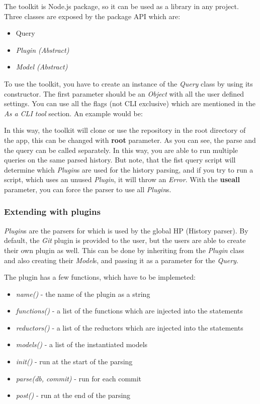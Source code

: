 The toolkit is Node.js package, so it can be used as a library in any project.
Three classes are exposed by the package API which are:

\begin{itemize}
	\item Query
	\item \textit{Plugin (Abstract)}
	\item \textit{Model (Abstract)}
\end{itemize}

To use the toolkit, you have to create an instance of the \textit{Query} class by using its constructor.
The first parameter should be an \textit{Object} with all the user defined settings. 
You can use all the flags (not CLI exclusive) which are mentioned in the \textit{As a CLI tool} section.
An example would be:



In this way, the toolkit will clone or use the repository in the root directory of the app, this can be changed with \textbf{root} parameter.
As you can see, the parse and the query can be called separately. In this way, you are able to run multiple queries on the same parsed history.
But note, that the fist query script will determine which \textit{Plugin}s are used for the history parsing, and if you try to run a script, which
uses an unused \textit{Plugin}, it will throw an \textit{Error}. With the \textbf{useall} parameter, you can force the parser to use all \textit{Plugin}s.

\subsubsection{Extending with plugins}

\textit{Plugin}s are the parsers for which is used by the global HP (History parser). 
By default, the \textit{Git} plugin is provided to the user, but the users are able to create their own plugin as well.
\newline
This can be done by inheriting from the \textit{Plugin} class and also creating their \textit{Model}s, and passing it as a parameter for the \textit{Query}.

The plugin has a few functions, which have to be implemeted:
\begin{itemize}
	\item \textit{name()} - the name of the plugin as a string
	\item \textit{functions()} - a list of the functions which are injected into the statements
	\item \textit{reductors()} - a list of the reductors which are injected into the statements
	\item \textit{models()} - a list of the instantiated models
 
	\item \textit{init()} - run at the start of the parsing
	\item \textit{parse(db, commit)} - run for each commit
	\item \textit{post()} - run at the end of the parsing
\end{itemize}

